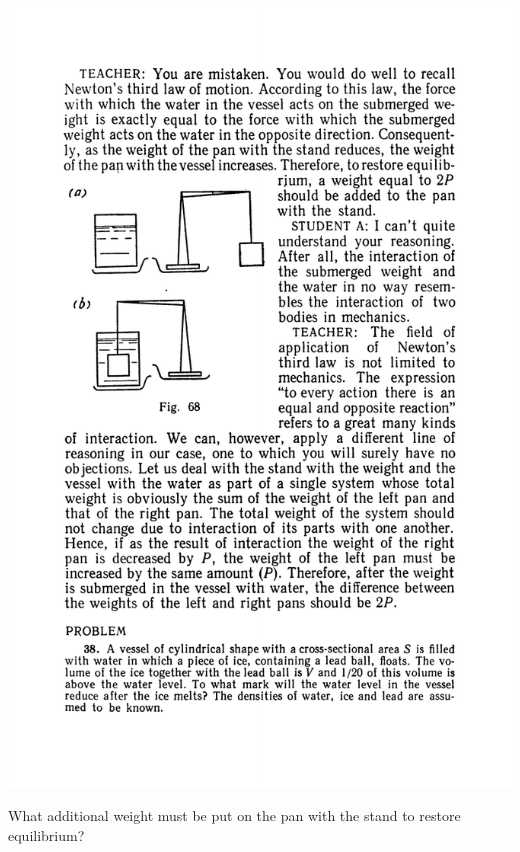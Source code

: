\documentclass[a4paper,sfsidenotes]{tufte-book}
\begin{document}
\begin{marginfigure}
\centering
\includegraphics[width=\linewidth,angle=-2]{fig-068a}
\caption{What additional weight must be put on the pan with the stand to restore equilibrium?}
\label{fig-68}
\end{marginfigure}
\end{document}
